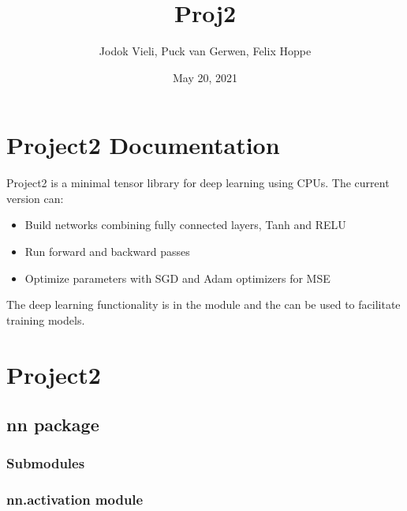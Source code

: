 \documentclass[letterpaper,10pt,english,openany,oneside]{sphinxmanual}
\title{Proj2}
\date{May 20, 2021}
\author{Jodok Vieli, Puck van Gerwen, Felix Hoppe}
\begin{document}
\pagestyle{empty}
\sphinxmaketitle
\pagestyle{plain}
\sphinxtableofcontents
\pagestyle{normal}
\label{\detokenize{index::doc}}



\section{Project2 Documentation}
\label{\detokenize{readme_link:project2-documentation}}\label{\detokenize{readme_link::doc}}
Project2 is a minimal tensor library for deep learning using CPUs. The current version can:
\begin{itemize}
\item {} 
Build networks combining fully connected layers, Tanh and RELU

\item {} 
Run forward and backward passes

\item {} 
Optimize parameters with SGD and Adam optimizers for MSE

\end{itemize}

The deep learning functionality is in the  module and the  can be used to facilitate training models.


\section{Project2}
\label{\detokenize{modules:project2}}\label{\detokenize{modules::doc}}

\subsection{nn package}
\label{\detokenize{nn:nn-package}}\label{\detokenize{nn::doc}}

\subsubsection{Submodules}
\label{\detokenize{nn:submodules}}

\subsubsection{nn.activation module}
\label{\detokenize{nn:module-nn.activation}}\label{\detokenize{nn:nn-activation-module}}
\end{document}
